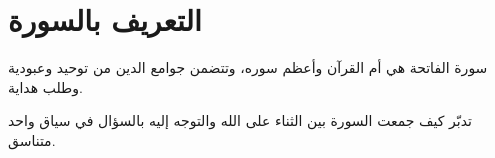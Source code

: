 

\section{التعريف بالسورة}

سورة الفاتحة هي أم القرآن وأعظم سوره، وتتضمن جوامع الدين من توحيد وعبودية وطلب هداية.

\begin{tadaburbox}
تدبّر كيف جمعت السورة بين الثناء على الله والتوجه إليه بالسؤال في سياق واحد متناسق.
\end{tadaburbox}
